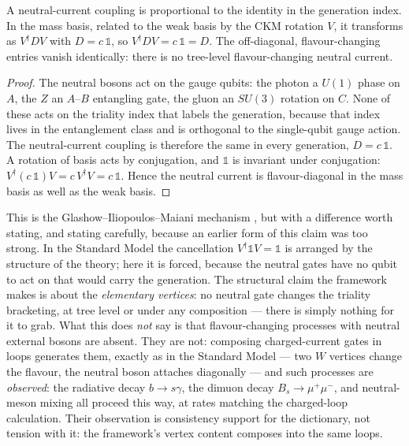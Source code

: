 \begin{proposition}\label{prop:fcnc}
A neutral-current coupling is proportional to the identity in the generation index. In the mass
basis, related to the weak basis by the CKM rotation $V$, it transforms as $V^\dagger D V$ with
$D = c\,\mathbb{1}$, so $V^\dagger D V = c\,\mathbb{1} = D$. The off-diagonal, flavour-changing
entries vanish identically: there is no tree-level flavour-changing neutral current.
\end{proposition}

\begin{proof}
The neutral bosons act on the gauge qubits: the photon a $U(1)$ phase on $A$, the $Z$ an $A$--$B$
entangling gate, the gluon an $SU(3)$ rotation on $C$. None of these acts on the triality index that
labels the generation, because that index lives in the entanglement class and is orthogonal to the
single-qubit gauge action. The neutral-current coupling is therefore the same in every generation,
$D = c\,\mathbb{1}$. A rotation of basis acts by conjugation, and $\mathbb{1}$ is invariant under
conjugation: $V^\dagger (c\,\mathbb{1}) V = c\,V^\dagger V = c\,\mathbb{1}$. Hence the neutral current
is flavour-diagonal in the mass basis as well as the weak basis.
\end{proof}

This is the Glashow--Iliopoulos--Maiani mechanism \autocite{glashowiliopoulosmaiani1970weak}, but with
a difference worth stating, and stating carefully, because an earlier form of this claim was too
strong. In the Standard Model the cancellation $V^\dagger\mathbb{1}V=\mathbb{1}$ is arranged by the
structure of the theory; here it is forced, because the neutral gates have no qubit to act on that
would carry the generation. The structural claim the framework makes is about the \emph{elementary
vertices}: no neutral gate changes the triality bracketing, at tree level or under any composition
--- there is simply nothing for it to grab. What this does \emph{not} say is that flavour-changing
processes with neutral external bosons are absent. They are not: composing charged-current gates in
loops generates them, exactly as in the Standard Model --- two $W$ vertices change the flavour, the
neutral boson attaches diagonally --- and such processes are \emph{observed}: the radiative decay
$b\to s\gamma$, the dimuon decay $B_s\to\mu^+\mu^-$, and neutral-meson mixing all proceed this way,
at rates matching the charged-loop calculation. Their observation is consistency support for the
dictionary, not tension with it: the framework's vertex content composes into the same loops.

